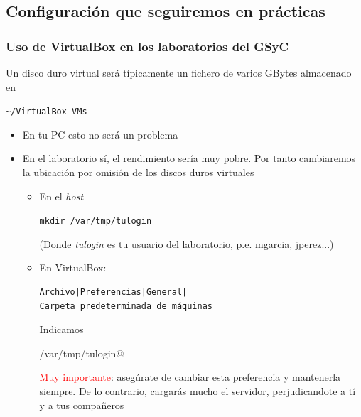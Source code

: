 \documentclass[ucs]{beamer}
\begin{document}
\subsection{Configuración que seguiremos en prácticas}
\begin{frame}[fragile]
\frametitle{Uso de VirtualBox en los laboratorios del GSyC}
Un disco duro virtual será típicamente un fichero de varios GBytes
almacenado en 

\verb|~/VirtualBox VMs|
\begin{itemize}

\item
En tu PC esto no será un problema

\item
En el laboratorio sí, el rendimiento sería muy pobre. Por tanto
cambiaremos la ubicación por omisión de los discos duros virtuales

\begin{itemize}
\item
En el  \emph{host}

\begin{scriptsize}
\verb|mkdir /var/tmp/tulogin|

(Donde \emph{tulogin} es tu usuario del laboratorio, p.e.  mgarcia, jperez...)
\end{scriptsize}
\item


En VirtualBox:

\begin{scriptsize}
\begin{verbatim}
Archivo|Preferencias|General|
Carpeta predeterminada de máquinas
\end{verbatim}
\end{scriptsize}


Indicamos

\begin{scriptsize}
\verb@/var/tmp/tulogin@
\end{scriptsize}

\begin{scriptsize}

\textcolor{red}{Muy importante}: asegúrate de cambiar
esta preferencia y mantenerla siempre. De lo contrario, cargarás mucho el
servidor, perjudicandote a tí y a tus compañeros
\end{scriptsize}
\end{itemize}
\end{itemize}
\end{frame}
\end{document}
